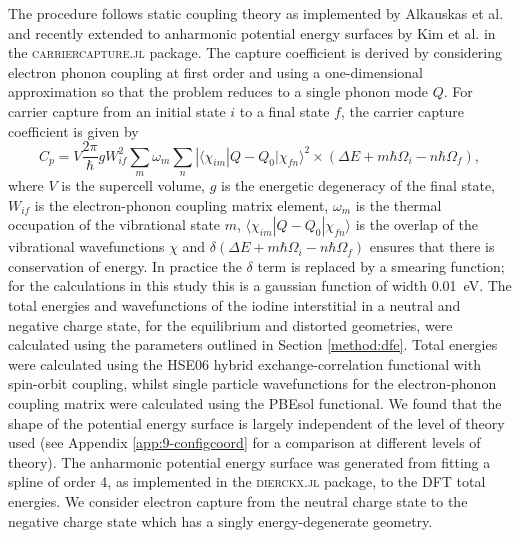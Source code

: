 The procedure follows static coupling theory as implemented by Alkauskas et al.\autocite{Alkauskas2014} and recently extended to anharmonic potential energy surfaces by Kim et al. in the \textsc{carriercapture.jl} package.\autocite{carriercapture,Kim2019}
The capture coefficient is derived by considering electron phonon coupling at first order and using a one-dimensional approximation so that the problem reduces to a single phonon mode $Q$. For carrier capture from an initial state $i$ to a final state $f$, the carrier capture coefficient is given by
\begin{equation} \label{carriercapteqn}
    C_p = V\frac{2\pi}{\hbar}gW_{if}^2\sum_m\omega_m\sum_n|\langle\chi_{im}|Q-Q_0|\chi_{fn}\rangle^2\times (\Delta E+m\hbar\Omega_i-n\hbar\Omega_f),
\end{equation}
where $V$ is the supercell volume, $g$ is the energetic degeneracy of the final state, $W_{if}$ is the electron-phonon coupling matrix element, $\omega_m$ is the thermal occupation of the vibrational state $m$, $\langle\chi_{im}|Q-Q_0|\chi_{fn}\rangle$ is the overlap of the vibrational wavefunctions $\chi$ and $\delta(\Delta E+m\hbar\Omega_i-n\hbar\Omega_f)$ ensures that there is conservation of energy. In practice the $\delta$ term is replaced by a smearing function; for the calculations in this study this is a gaussian function of width \SI{0.01}{\electronvolt}.
The total energies and wavefunctions of the iodine interstitial in a neutral and negative charge state, for the equilibrium and distorted geometries, were calculated using the parameters outlined in Section \ref{method:dfe}. Total energies were calculated using the HSE06 hybrid exchange-correlation functional with spin-orbit coupling, whilst single particle wavefunctions for the electron-phonon coupling matrix were calculated using the PBEsol functional.
We found that the shape of the potential energy surface is largely independent of the level of theory used (see Appendix \ref{app:9-configcoord} for a comparison at different levels of theory).
The anharmonic potential energy surface was generated from fitting a spline of order 4, as implemented in the \textsc{dierckx.jl} package,\autocite{dierckx} to the DFT total energies. 
We consider electron capture from the neutral charge state to the negative charge state which has a singly energy-degenerate geometry.

